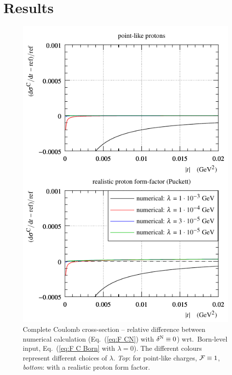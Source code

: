 \documentclass{appolb}
\begin{document}

\section{Results}
\label{sec:results}

\begin{figure}[h]
\begin{center}
\includegraphics{fig/coul_complete_cmp_lambda_dsdt.pdf}
\caption{Complete Coulomb cross-section -- relative difference between numerical calculation (Eq.~(\ref{eq:F CN}) with $\delta^{\rm N} \equiv 0$) wrt.~Born-level input, Eq.~(\ref{eq:F C Born} with $\lambda = 0$). The different colours represent different choices of $\lambda$. {\it Top}: for point-like charges, ${\cal F} \equiv 1$, {\it bottom}: with a realistic proton form factor.}
\label{f:sig C}
\end{center}
\end{figure}
\end{document}
